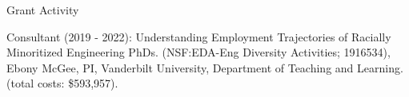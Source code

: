 \begin{rSection}{\textrm{Grant Activity}}%
\begin{etaremune}
\item 
Consultant (2019 - 2022): Understanding Employment Trajectories of Racially Minoritized Engineering PhDs. (NSF:EDA-Eng Diversity Activities; 1916534),
Ebony McGee, PI, Vanderbilt University, Department of Teaching and Learning.  (total costs: \$593,957).
\end{etaremune}\end{rSection}


